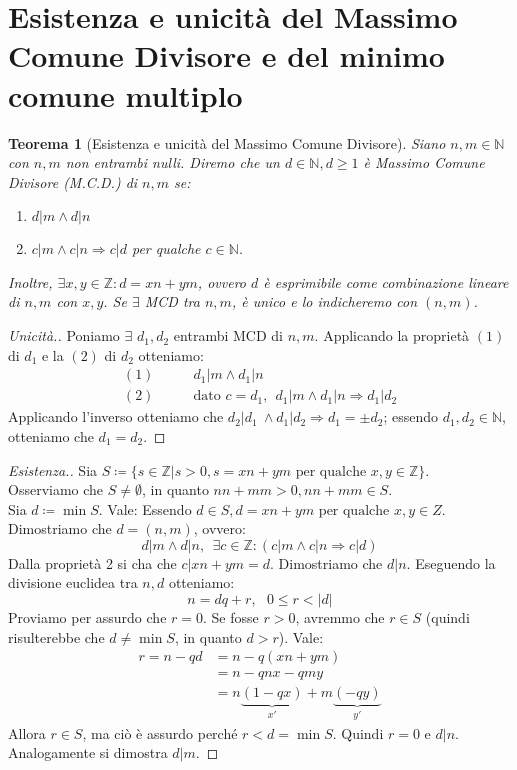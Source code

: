 \documentclass[12pt]{article}
\newcommand{\N}{\mathbb{N}}
\newcommand{\Z}{\mathbb{Z}}
\newcommand{\implica}{\Longrightarrow}
\newcommand{\pq}{\text{ per qualche }}
\renewcommand\qedsymbol{$\blacksquare$}
\newtheorem{theorem}{Teorema}
\begin{document}
\section{Esistenza e unicità del Massimo Comune Divisore e del minimo comune multiplo}
\begin{theorem}[Esistenza e unicità del Massimo Comune Divisore]
	Siano $n, m \in \N$ con $n, m$ non entrambi nulli. Diremo che un $d \in \N, d \ge 1$ è Massimo Comune Divisore (M.C.D.) di $n, m$ se:
	\begin{enumerate}
		\item$d | m \land d | n $
		\item$c | m \land c | n \implica c | d$ per qualche $c \in \N$.
	\end{enumerate}
	Inoltre, $\exists x, y \in \Z : d = xn + ym$, ovvero $d$ è esprimibile come combinazione lineare di $n, m$ con $x, y$.  Se $\exists$ MCD tra $n, m$, è unico e lo indicheremo con $(n, m)$.
\end{theorem}

\renewcommand\qedsymbol{$\square$}
\begin{proof}[Unicità.]
	Poniamo $\exists$ $d_1, d_2$ entrambi MCD di $n, m$. Applicando la proprietà $(1)$ di $d_1$ e la $(2)$ di $d_2$ otteniamo:
	\begin{align*}
		(1)\qquad & d_1 | m \land d_1 | n                                             \\
		(2)\qquad & \text{dato }c = d_1, \ \ d_1 | m \land d_1 | n \implica d_1 | d_2
	\end{align*}
	Applicando l'inverso otteniamo che $d_2 | d_1\ \land d_1 | d_2 \implica d_1 = \pm d_2$; essendo $d_1, d_2 \in \N$, otteniamo che
	$ d_1 = d_2$.
\end{proof}

\renewcommand\qedsymbol{$\blacksquare$}
\begin{proof}[Esistenza.]
	Sia $S \coloneqq \{ s \in \Z | s > 0, s = xn + ym \text{ per qualche } x, y \in \Z\}$.
	\\Osserviamo che $S \ne \emptyset$, in quanto $nn + mm > 0, nn + mm \in S$.
	\\Sia $d \coloneqq \min S$. Vale:
	Essendo $d \in S, d = xn+ym \pq x, y \in Z$. Dimostriamo che $d = (n,m)$, ovvero:
	$$ d | m \land d | n ,\ \ \exists c \in \Z : (c | m \land c | n \implica c | d)$$
	Dalla proprietà 2 si cha che $c | xn + ym = d$. Dimostriamo che $d | n$. Eseguendo la divisione euclidea tra $n, d$ otteniamo:
	$$n = dq + r, \text{ } 0 \le r < |d|$$
	Proviamo per assurdo che $r = 0$. Se fosse $r > 0$, avremmo che $r \in S$ (quindi risulterebbe che $d \ne \min S$, in quanto $d > r$). Vale:
	\begin{align*}
		r = n - qd & = n - q(xn+ym)                                         \\
		& = n - qnx - qmy                                        \\
		& = n\underbrace{(1-qx)}_{x'} + m\underbrace{(-qy)}_{y'}
	\end{align*}
	Allora $r \in S$, ma ciò è assurdo perché $r < d = \min S$. Quindi $r = 0$ e $d|n$. Analogamente si dimostra $d | m$.
\end{proof}
\end{document}
